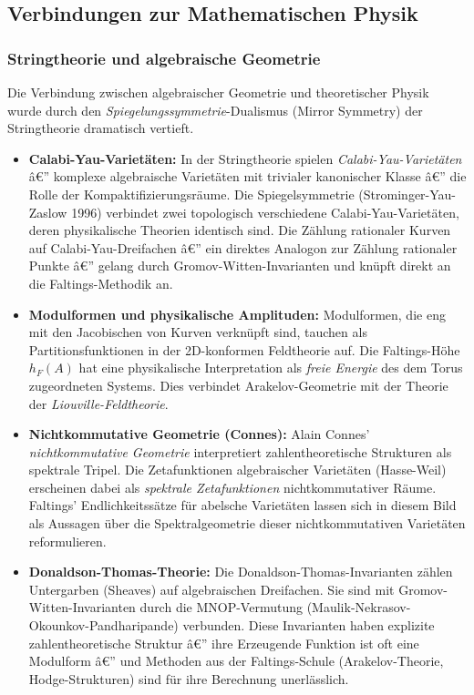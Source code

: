﻿\documentclass[12pt,a4paper]{article}
\theoremstyle{plain}
\theoremstyle{definition}
\theoremstyle{remark}
\begin{document}
\subsection{Verbindungen zur Mathematischen Physik}

\subsubsection{Stringtheorie und algebraische Geometrie}

Die Verbindung zwischen algebraischer Geometrie und theoretischer Physik wurde durch
den \emph{Spiegelungssymmetrie}-Dualismus (Mirror Symmetry) der Stringtheorie
dramatisch vertieft.

\begin{itemize}[leftmargin=2em,itemsep=4pt]
  \item \textbf{Calabi-Yau-Varietäten:}
    In der Stringtheorie spielen \emph{Calabi-Yau-Varietäten} â€” komplexe algebraische
    Varietäten mit trivialer kanonischer Klasse â€” die Rolle der Kompaktifizierungsräume.
    Die Spiegelsymmetrie (Strominger-Yau-Zaslow 1996) verbindet zwei topologisch
    verschiedene Calabi-Yau-Varietäten, deren physikalische Theorien identisch sind.
    Die Zählung rationaler Kurven auf Calabi-Yau-Dreifachen â€” ein direktes Analogon
    zur Zählung rationaler Punkte â€” gelang durch Gromov-Witten-Invarianten und
    knüpft direkt an die Faltings-Methodik an.

  \item \textbf{Modulformen und physikalische Amplituden:}
    Modulformen, die eng mit den Jacobischen von Kurven verknüpft sind, tauchen
    als Partitionsfunktionen in der 2D-konformen Feldtheorie auf. Die Faltings-Höhe
    $h_F(A)$ hat eine physikalische Interpretation als \emph{freie Energie} des
    dem Torus zugeordneten Systems. Dies verbindet Arakelov-Geometrie mit
    der Theorie der \emph{Liouville-Feldtheorie}.

  \item \textbf{Nichtkommutative Geometrie (Connes):}
    Alain Connes' \emph{nichtkommutative Geometrie} interpretiert zahlentheoretische
    Strukturen als spektrale Tripel. Die Zetafunktionen algebraischer Varietäten
    (Hasse-Weil) erscheinen dabei als \emph{spektrale Zetafunktionen} nichtkommutativer
    Räume. Faltings' Endlichkeitssätze für abelsche Varietäten lassen sich in diesem
    Bild als Aussagen über die Spektralgeometrie dieser nichtkommutativen Varietäten
    reformulieren.

  \item \textbf{Donaldson-Thomas-Theorie:}
    Die Donaldson-Thomas-Invarianten zählen Untergarben (Sheaves) auf algebraischen
    Dreifachen. Sie sind mit Gromov-Witten-Invarianten durch die MNOP-Vermutung
    (Maulik-Nekrasov-Okounkov-Pandharipande) verbunden. Diese Invarianten haben
    explizite zahlentheoretische Struktur â€” ihre Erzeugende Funktion ist oft eine
    Modulform â€” und Methoden aus der Faltings-Schule (Arakelov-Theorie, Hodge-Strukturen)
    sind für ihre Berechnung unerlässlich.
\end{itemize}
\end{document}
